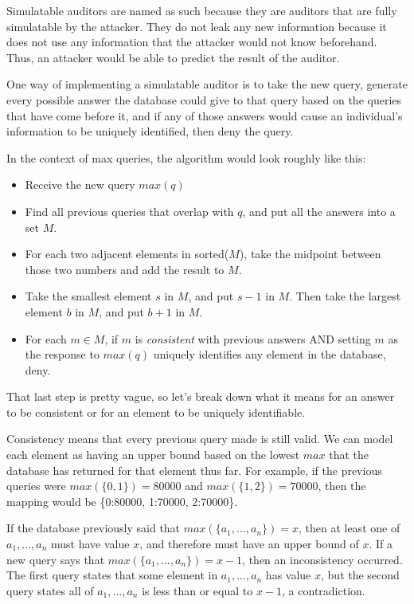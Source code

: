 \documentclass{article}
\begin{document}
Simulatable auditors are named as such because they are auditors that are fully simulatable by the attacker.
They do not leak any new information because it does not use any information that the attacker would not know beforehand.
Thus, an attacker would be able to predict the result of the auditor.

One way of implementing a simulatable auditor is to take the new query, generate every possible answer the database could give to that query based on the queries that have come before it, and if any of those answers would cause an individual's information to be uniquely identified, then deny the query.

\begin{minipage}{\textwidth}
In the context of max queries, the algorithm would look roughly like this:
\begin{itemize}
    \item Receive the new query $max(q)$
    \item Find all previous queries that overlap with $q$, and put all the answers into a set $M$.
    \item For each two adjacent elements in sorted($M$), take the midpoint between those two numbers and add the result to $M$.
    \item Take the smallest element $s$ in $M$, and put $s-1$ in $M$. Then take the largest element $b$ in $M$, and put $b+1$ in $M$.
    \item For each $m \in M$, if $m$ is \textit{consistent} with previous answers AND setting $m$ as the response to $max(q)$ uniquely identifies any element in the database, deny.
\end{itemize}
\end{minipage}

That last step is pretty vague, so let's break down what it means for an answer to be consistent or for an element to be uniquely identifiable.

Consistency means that every previous query made is still valid.
We can model each element as having an upper bound based on the lowest $max$ that the database has returned for that element thus far.
For example, if the previous queries were $max(\{0, 1\}) = 80000$ and $max(\{1, 2\}) = 70000$, then the mapping would be \{0:80000, 1:70000, 2:70000\}.

If the database previously said that $max(\{a_1, ..., a_n\}) = x$, then at least one of $a_1, ..., a_n$ must have value $x$, and therefore must have an upper bound of $x$. 
If a new query says that $max(\{a_1, ..., a_n\}) = x-1$, then an inconsistency occurred.
The first query states that some element in $a_1, ..., a_n$ has value $x$, but the second query states all of $a_1, ..., a_n$ is less than or equal to $x-1$, a contradiction.
\end{document}
